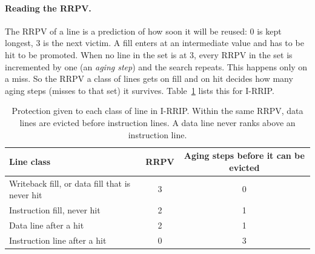 \documentclass[11pt,a4paper]{article}
\begin{document}
\paragraph{Reading the RRPV.} The RRPV of a line is a prediction of how soon it will be reused: 0
is kept longest, 3 is the next victim. A fill enters at an intermediate value and has to be hit
to be promoted. When no line in the set is at 3, every RRPV in the set is incremented by one (an
\emph{aging step}) and the search repeats. This happens only on a miss. So the RRPV a class of
lines gets on fill and on hit decides how many aging steps (misses to that set) it survives.
Table~\ref{tab:task2a-protect} lists this for I-RRIP.

\begin{table}[H]
    \centering
    \begin{tabular}{lcc}
        \toprule
        Line class & RRPV & Aging steps before it can be evicted \\
        \midrule
        Writeback fill, or data fill that is never hit & 3 & 0 \\
        Instruction fill, never hit                    & 2 & 1 \\
        Data line after a hit                          & 2 & 1 \\
        Instruction line after a hit                   & 0 & 3 \\
        \bottomrule
    \end{tabular}
    \caption{Protection given to each class of line in I-RRIP. Within the same RRPV, data lines are evicted before instruction lines. A data line never ranks above an instruction line.}
    \label{tab:task2a-protect}
\end{table}
\end{document}
